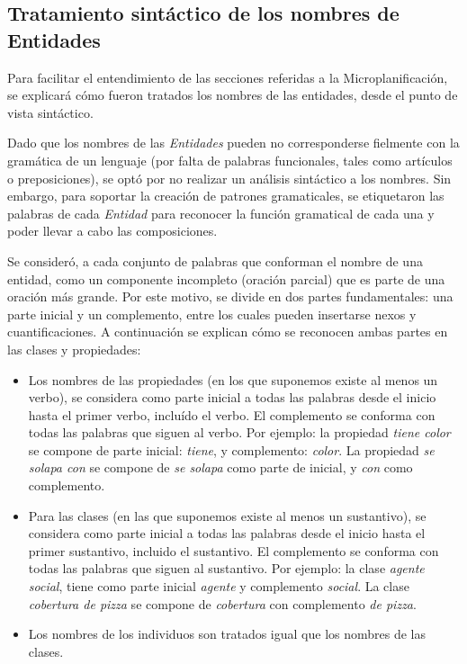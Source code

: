 \subsection{Tratamiento sintáctico de los nombres de Entidades}
Para facilitar el entendimiento de las secciones referidas a la Microplanificación, se explicará cómo fueron tratados los nombres de las entidades, desde el punto de vista sintáctico. 

Dado que los nombres de las\textit{ Entidades} pueden no corresponderse fielmente con la gramática de un lenguaje (por falta de palabras funcionales, tales como artículos o preposiciones), se optó por no realizar un análisis sintáctico a los nombres. Sin embargo, para soportar la creación de patrones gramaticales, se etiquetaron las palabras de cada \textit{Entidad }para reconocer la función gramatical de cada una y poder llevar a cabo las composiciones.

Se consideró, a cada conjunto de palabras que conforman el nombre de una entidad, como un componente incompleto (oración parcial) que es parte de una oración más grande. Por este motivo, se divide en dos partes fundamentales: una parte inicial y un complemento, entre los cuales pueden insertarse nexos y cuantificaciones. A continuación se explican cómo se reconocen ambas partes en las clases y propiedades:
\begin{itemize}
    \item Los nombres de las propiedades (en los que suponemos existe al menos un verbo), se considera como parte inicial a todas las palabras desde el inicio hasta el primer verbo, incluído el verbo. El complemento se conforma con todas las palabras que siguen al verbo. Por ejemplo: la propiedad \emph{tiene color} se compone de parte inicial: \emph{tiene}, y complemento: \emph{color}. La propiedad \emph{se solapa con} se compone de \emph{se solapa} como parte de inicial, y \emph{con} como complemento.
    \item Para las clases (en las que suponemos existe al menos un sustantivo), se considera como parte inicial a todas las palabras desde el inicio hasta el primer sustantivo, incluido el sustantivo. El complemento se conforma con todas las palabras que siguen al sustantivo. Por ejemplo: la clase \emph{agente social}, tiene como parte inicial \emph{agente} y complemento \emph{social}. La clase \emph{cobertura de pizza} se compone de \emph{cobertura} con complemento \emph{de pizza}.
    \item Los nombres de los individuos son tratados igual que los nombres de las clases.
\end{itemize}


